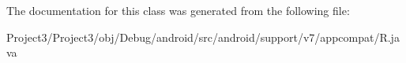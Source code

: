 The documentation for this class was generated from the following file\+:\begin{DoxyCompactItemize}
\item 
Project3/\+Project3/obj/\+Debug/android/src/android/support/v7/appcompat/R.\+java\end{DoxyCompactItemize}
